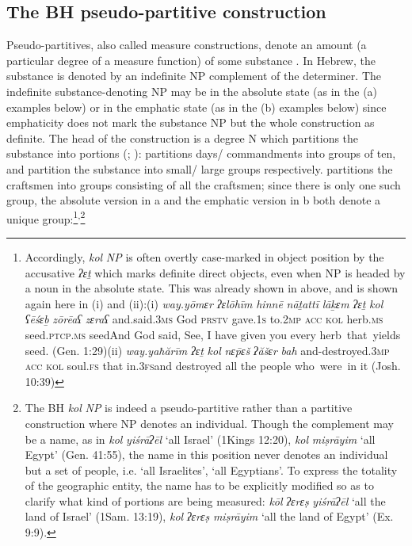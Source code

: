 \documentclass[output=paper]{langsci/langscibook}
\begin{document}
\subsection{The BH pseudo-partitive construction}%
Pseudo-partitives, also called measure constructions, denote an amount (a particular degree of a measure function) of some substance \citep{Selkirk1977}. In Hebrew, the substance is denoted by an indefinite NP complement of the determiner. The indefinite substance-denoting NP may be in the absolute state (as in the (a) examples below) or in the emphatic state (as in the (b) examples below) since emphaticity does not mark the substance NP but the whole construction as definite. The head of the construction is a degree N which partitions the substance into portions (\citealt{Schwarzschild2002}; \citealt{Ruys2017}):  partitions days/ commandments into groups of ten,  and  partition the substance into small/ large groups respectively.  partitions the craftsmen into groups consisting of all the craftsmen;  since there is only one such group, the absolute version in a and the emphatic version in b both denote a unique group:\footnote{Accordingly, \textrm{\textit{kol} \textit{NP}} \textrm{is often overtly case-marked in object position by the accusative} \textrm{\textit{ʔɛṯ}} \textrm{which marks definite direct objects, even when NP is headed by a noun in the absolute state. This was already shown in  above, and is shown again here in (i) and (ii):}\textrm{(i)}\textrm{  \textit{way.yōmɛr}      \textit{ʔɛlōhīm} \textit{hinnē}   \textit{nāṯattī}    \textit{lāḵɛm}    \textit{ʔɛṯ}   \textit{kol}    \textit{ʕēśɛḇ}       \textit{zōrēaʕ}             \textit{zɛraʕ}} \textrm{and.said}\textrm{\textsc{.3ms}} \textrm{God} \textrm{\textsc{prstv}} \textrm{gave.1}\textrm{\textsc{s}} \textrm{to.2}\textrm{\textsc{mp}} \textrm{\textsc{acc}} \textrm{\textsc{kol} } \textrm{herb.}\textrm{\textsc{ms}} \textrm{seed.}\textrm{\textsc{ptcp.ms}} \textrm{seed}\textrm{And God said, See, I have given you every herb}{\textrm{~}}\textrm{that}{\textrm{~}}\textrm{yields seed.} {\textrm{(Gen. 1:29)}}{\textrm{(ii)} }\textit{way.yaħărīm}           \textit{ʔɛṯ}   \textit{kol}  \textit{nɛ}\textrm{\textit{\={p}}}\textit{ɛš}     \textit{ʔăšɛr}  \textit{bah}  and-destroyed.\textsc{3mp} \textsc{acc} \textsc{kol} soul.\textsc{fs}  that    in.\textsc{3fs}\textrm{and destroyed all the people who~were~in it (Josh. 10:39)}}\textsuperscript{,}\footnote{The BH \textit{kol} \textit{NP} is indeed a pseudo-partitive rather than a partitive construction where NP denotes an individual. Though the complement may be a name, as in \textit{kol} \textrm{\textit{yiśrāʔēl}} ‘all Israel’ (1Kings 12:20), \textit{kol} \textit{miṣrāyim} ‘\textrm{all Egypt’ (Gen. 41:55), the name in this position never denotes an individual but a set of people, i.e. ‘all Israelites’, ‘all Egyptians’. To express the totality of the geographic entity, the name has to be explicitly modified so as to clarify what kind of portions are being measured:} \textrm{\textit{kōl} \textit{ʔɛrɛṣ}} \textrm{\textit{yiśrāʔēl}} ‘all the land of Israel’ (1Sam. 13:19),\textrm{ \textit{kol} \textit{ʔɛrɛṣ}} \textit{miṣrāyim} ‘all the land of Egypt’ (Ex. 9:9).}
\end{document}
